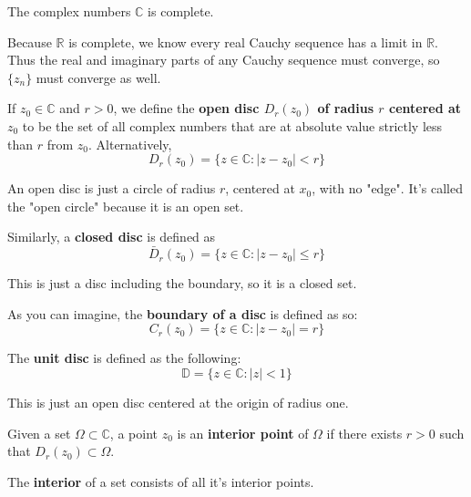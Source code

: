 \documentclass[12pt]{article}
\begin{document}
\begin{theorem}{}
  The complex numbers $\mathbb{C}$ is complete.
\end{theorem}
\begin{newproof}
  Because $\mathbb{R}$ is complete, we know every real Cauchy sequence has a limit in $\mathbb{R}$. Thus 
  the real and imaginary parts of any Cauchy sequence must converge, so $\{z_n\}$ must converge as well. 
\end{newproof}

\begin{definition}
  If $z_0 \in \mathbb{C}$ and $r > 0$, we define the \textbf{open disc $D_r(z_0)$ of radius $r$ centered 
  at $z_0$} to be the set of all complex numbers that are at absolute value strictly less than 
  $r$ from $z_0$. Alternatively,
  $$ D_r(z_0)=\{z \in \mathbb{C} : \vert z - z_0 \vert < r \} $$
\end{definition}

An open disc is just a circle of radius $r$, centered at $x_0$, with no "edge". It's called the "open circle" 
because it is an open set. 

\begin{definition}
  Similarly, a \textbf{closed disc} is defined as 
  $$ \bar{D}_r(z_0)=\{z \in \mathbb{C} : \vert z - z_0 \vert \leq r \} $$
\end{definition}

This is just a disc including the boundary, so it is a closed set. 

\begin{definition}
  As you can imagine, the \textbf{boundary of a disc} is defined as so:
  $$ C_r(z_0)=\{z \in \mathbb{C} : \vert z - z_0 \vert = r \} $$
\end{definition}

\begin{notation}
  The \textbf{unit disc} is defined as the following:
  $$ \mathbb{D} = \{ z \in \mathbb{C} : \vert z \vert < 1 \} $$
\end{notation}

This is just an open disc centered at the origin of radius one. 

\begin{definition}
  Given a set $\Omega \subset \mathbb{C}$, a point $z_0$ is an \textbf{interior point} of $\Omega$ if there 
  exists $r > 0$ such that $D_r(z_0) \subset \Omega$.
\end{definition}

\begin{definition}
  The \textbf{interior} of a set consists of all it's interior points.
\end{definition}
\end{document}
